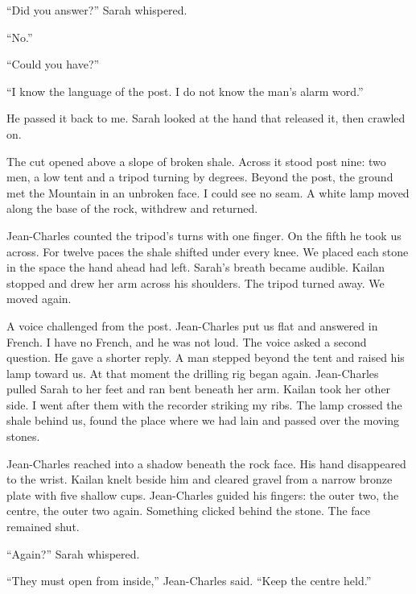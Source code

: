 ``Did you answer?'' Sarah whispered.\par

``No.''\par

``Could you have?''\par

``I know the language of the post. I do not know the man's alarm word.''\par

He passed it back to me. Sarah looked at the hand that released it, then crawled on.\par

The cut opened above a slope of broken shale. Across it stood post nine: two men, a low tent and a tripod turning by degrees. Beyond the post, the ground met the Mountain in an unbroken face. I could see no seam. A white lamp moved along the base of the rock, withdrew and returned.\par

Jean-Charles counted the tripod's turns with one finger. On the fifth he took us across. For twelve paces the shale shifted under every knee. We placed each stone in the space the hand ahead had left. Sarah's breath became audible. Kailan stopped and drew her arm across his shoulders. The tripod turned away. We moved again.\par

A voice challenged from the post. Jean-Charles put us flat and answered in French. I have no French, and he was not loud. The voice asked a second question. He gave a shorter reply. A man stepped beyond the tent and raised his lamp toward us. At that moment the drilling rig began again. Jean-Charles pulled Sarah to her feet and ran bent beneath her arm. Kailan took her other side. I went after them with the recorder striking my ribs. The lamp crossed the shale behind us, found the place where we had lain and passed over the moving stones.\par

Jean-Charles reached into a shadow beneath the rock face. His hand disappeared to the wrist. Kailan knelt beside him and cleared gravel from a narrow bronze plate with five shallow cups. Jean-Charles guided his fingers: the outer two, the centre, the outer two again. Something clicked behind the stone. The face remained shut.\par

``Again?'' Sarah whispered.\par

``They must open from inside,'' Jean-Charles said. ``Keep the centre held.''\par

